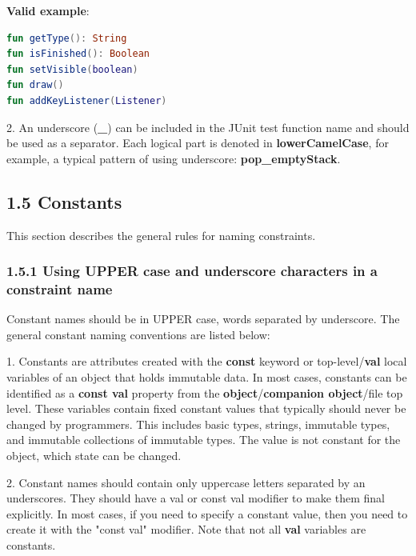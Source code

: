 {{{{\textbf{Valid example}: 



\begin{lstlisting}[language=Kotlin]
fun getType(): String
fun isFinished(): Boolean
fun setVisible(boolean)
fun draw()
fun addKeyListener(Listener)
\end{lstlisting}


2.	An underscore (\textbf{_}) can be included in the JUnit test function name and should be used as a separator. Each logical part is denoted in \textbf{lowerCamelCase}, for example, a typical pattern of using underscore: \textbf{pop_emptyStack}.

\subsection*{\textbf{1.5 Constants}}

\label{sec:1.5}

This section describes the general rules for naming constraints.

\subsubsection*{\textbf{1.5.1 Using UPPER case and underscore characters in a constraint name}}
\leavevmode\newline

\label{sec:1.5.1}

Constant names should be in UPPER case, words separated by underscore. The general constant naming conventions are listed below:

1. Constants are attributes created with the \textbf{const} keyword or top-level/\textbf{val} local variables of an object that holds immutable data. In most cases, constants can be identified as a \textbf{const val} property from the \textbf{object}/\textbf{companion object}/file top level. These variables contain fixed constant values that typically should never be changed by programmers. This includes basic types, strings, immutable types, and immutable collections of immutable types. The value is not constant for the object, which state can be changed.

2. Constant names should contain only uppercase letters separated by an underscores. They should have a val or const val modifier to make them final explicitly. In most cases, if you need to specify a constant value, then you need to create it with the "const val" modifier. Note that not all \textbf{val} variables are constants.

}}}}
